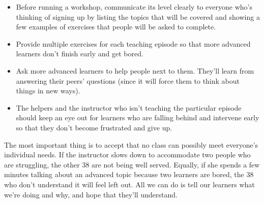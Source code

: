 \begin{itemize}
\item
  Before running a workshop, communicate its level clearly to everyone
  who's thinking of signing up by listing the topics that will be
  covered and showing a few examples of exercises that people will be
  asked to complete.
\item
  Provide multiple exercises for each teaching episode so that more
  advanced learners don't finish early and get bored.
\item
  Ask more advanced learners to help people next to them. They'll learn
  from answering their peers' questions (since it will force them to
  think about things in new ways).
\item
  The helpers and the instructor who isn't teaching the particular
  episode should keep an eye out for learners who are falling behind and
  intervene early so that they don't become frustrated and give up.
\end{itemize}

The most important thing is to accept that no class can possibly meet
everyone's individual needs. If the instructor slows down to accommodate
two people who are struggling, the other 38 are not being well served.
Equally, if she spends a few minutes talking about an advanced topic
because two learners are bored, the 38 who don't understand it will feel
left out. All we can do is tell our learners what we're doing and why,
and hope that they'll understand.


